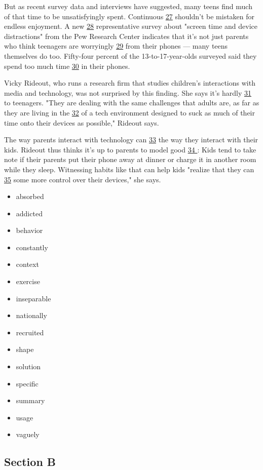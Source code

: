 \documentclass[UTF8,11pt]{ctexart}
\begin{document}
But as recent survey data and interviews have suggested, many teens find much of that time to be unsatisfyingly spent. Continuous \uline{27} shouldn't be mistaken for endless enjoyment. A new \uline{28} representative survey about "screen time and device distractions" from the Pew Research Center indicates that it's not just parents who think teenagers are worryingly \uline{29} from their phones — many teens themselves do too. Fifty-four percent of the 13-to-17-year-olds surveyed said they spend too much time \uline{30} in their phones.


Vicky Rideout, who runs a research firm that studies children's interactions with media and technology, was not surprised by this finding. She says it's hardly \uline{31} to teenagers. "They are dealing with the same challenges that adults are, as far as they are living in the \uline{32} of a tech environment designed to suck as much of their time onto their devices as possible," Rideout says.


The way parents interact with technology can \uline{33} the way they interact with their kids. Rideout thus thinks it's up to parents to model good \uline{34 }: Kids tend to take note if their parents put their phone away at dinner or charge it in another room while they sleep. Witnessing habits like that can help kids "realize that they can \uline{35} some more control over their devices," she says.


\begin{itemize}[leftmargin=2em,itemsep=.2em,topsep=.4em]\item[A.] absorbed
\item[B.] addicted
\item[C.] behavior
\item[D.] constantly
\item[E.] context
\item[F.] exercise
\item[G.] inseparable
\item[H.] nationally
\item[I.] recruited
\item[J.] shape
\item[K.] solution
\item[L.] specific
\item[M.] summary
\item[N.] usage
\item[O.] vaguely
\end{itemize}

\subsection*{\textbf{Section B}}
\end{document}
